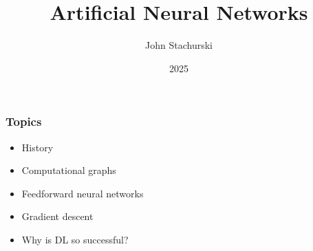 

\title{Artificial Neural Networks}

\author{John Stachurski}


\date{2025}




\begin{frame}
  \titlepage
\end{frame}



\begin{frame}
    \frametitle{Topics}

    \begin{itemize}
        \item History
        \vspace{0.5em}
        \item Computational graphs
        \vspace{0.5em}
        \item Feedforward neural networks
        \vspace{0.5em}
        \item Gradient descent
        \vspace{0.5em}
        \item Why is DL so successful?
        \vspace{0.5em}
    \end{itemize}

\end{frame}


